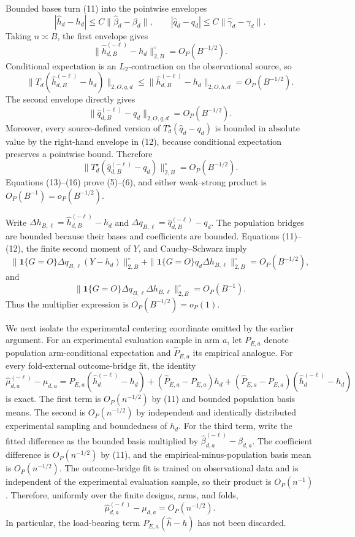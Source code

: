 Bounded bases turn (11) into the pointwise envelopes
\[
 |\widehat h_d-h_d|\le C\|\widehat\beta_d-\beta_d\|,
 \qquad
 |\widehat q_d-q_d|\le C\|\widehat\gamma_d-\gamma_d\|.    \tag{12}
\]
Taking \(n\asymp B\), the first envelope gives
\[
 \|\widehat h_{d,B}^{(-\ell)}-h_d\|_{2,B}^{\circ}
 =O_P(B^{-1/2}).                                               \tag{13}
\]
Conditional expectation is an \(L_2\)-contraction on the observational source, so
\[
 \|T_d(\widehat h_{d,B}^{(-\ell)}-h_d)\|_{2,O,q,d}
 \le \|\widehat h_{d,B}^{(-\ell)}-h_d\|_{2,O,h,d}
 =O_P(B^{-1/2}).                                               \tag{14}
\]
The second envelope directly gives
\[
 \|\widehat q_{d,B}^{(-\ell)}-q_d\|_{2,O,q,d}
 =O_P(B^{-1/2}).                                               \tag{15}
\]
Moreover, every source-defined version of \(T_d^\star(\widehat q_d-q_d)\) is bounded in absolute value by the right-hand envelope in (12), because conditional expectation preserves a pointwise bound.  Therefore
\[
 \|T_d^\star(\widehat q_{d,B}^{(-\ell)}-q_d)\|_{2,B}^{\circ}
 =O_P(B^{-1/2}).                                               \tag{16}
\]
Equations (13)--(16) prove (5)--(6), and either weak--strong product is \(O_P(B^{-1})=o_P(B^{-1/2})\).

Write \(\Delta h_{B,\ell}=\widehat h_{d,B}^{(-\ell)}-h_d\) and \(\Delta q_{B,\ell}=\widehat q_{d,B}^{(-\ell)}-q_d\).  The population bridges are bounded because their bases and coefficients are bounded.  Equations (11)--(12), the finite second moment of \(Y\), and Cauchy--Schwarz imply
\[
 \|\mathbf1\{G=O\}\Delta q_{B,\ell}(Y-h_d)\|_{2,B}^{\circ}
 +\|\mathbf1\{G=O\}q_d\Delta h_{B,\ell}\|_{2,B}^{\circ}
 =O_P(B^{-1/2}),                                               \tag{17}
\]
and
\[
 \|\mathbf1\{G=O\}\Delta q_{B,\ell}\Delta h_{B,\ell}\|_{2,B}^{\circ}
 =O_P(B^{-1}).                                                 \tag{18}
\]
Thus the multiplier expression is \(O_P(B^{-1/2})=o_P(1)\).

We next isolate the experimental centering coordinate omitted by the earlier argument.  For an experimental evaluation sample in arm \(a\), let \(P_{E,a}\) denote population arm-conditional expectation and \(\widehat P_{E,a}\) its empirical analogue.  For every fold-external outcome-bridge fit, the identity
\[
 \widehat\mu_{d,a}^{(-\ell)}-\mu_{d,a}
 =P_{E,a}(\widehat h_d^{(-\ell)}-h_d)
 +(\widehat P_{E,a}-P_{E,a})h_d
 +(\widehat P_{E,a}-P_{E,a})(\widehat h_d^{(-\ell)}-h_d)    \tag{19}
\]
is exact.  The first term is \(O_P(n^{-1/2})\) by (11) and bounded population basis means.  The second is \(O_P(n^{-1/2})\) by independent and identically distributed experimental sampling and boundedness of \(h_d\).  For the third term, write the fitted difference as the bounded basis multiplied by \(\widehat\beta_{d,a}^{(-\ell)}-\beta_{d,a}\).  The coefficient difference is \(O_P(n^{-1/2})\) by (11), and the empirical-minus-population basis mean is \(O_P(n^{-1/2})\).  The outcome-bridge fit is trained on observational data and is independent of the experimental evaluation sample, so their product is \(O_P(n^{-1})\).  Therefore, uniformly over the finite designs, arms, and folds,
\[
 \widehat\mu_{d,a}^{(-\ell)}-\mu_{d,a}=O_P(n^{-1/2}).        \tag{20}
\]
In particular, the load-bearing term \(P_{E,a}(\widehat h-h)\) has not been discarded.

